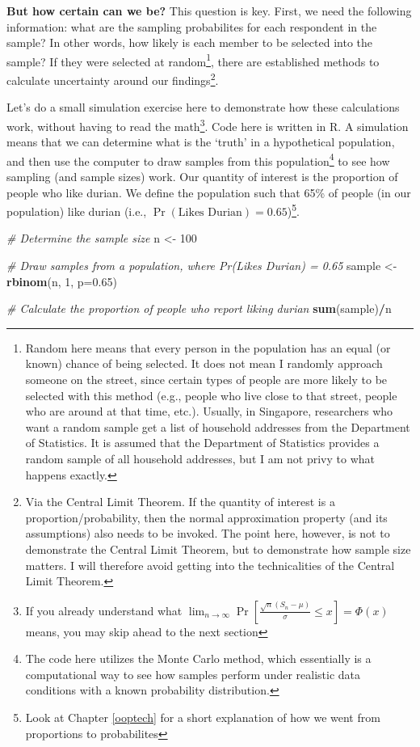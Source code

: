 \documentclass[openany]{book}
\newenvironment{Shaded}{\begin{snugshade}}{\end{snugshade}}
\newcommand{\KeywordTok}[1]{\textcolor[rgb]{0.13,0.29,0.53}{\textbf{#1}}}
\newcommand{\DataTypeTok}[1]{\textcolor[rgb]{0.13,0.29,0.53}{#1}}
\newcommand{\DecValTok}[1]{\textcolor[rgb]{0.00,0.00,0.81}{#1}}
\newcommand{\FloatTok}[1]{\textcolor[rgb]{0.00,0.00,0.81}{#1}}
\newcommand{\StringTok}[1]{\textcolor[rgb]{0.31,0.60,0.02}{#1}}
\newcommand{\CommentTok}[1]{\textcolor[rgb]{0.56,0.35,0.01}{\textit{#1}}}
\newcommand{\OperatorTok}[1]{\textcolor[rgb]{0.81,0.36,0.00}{\textbf{#1}}}
\newcommand{\NormalTok}[1]{#1}
\let\rmarkdownfootnote\footnote%
\def\footnote{\protect\rmarkdownfootnote}
\begin{document}
\textbf{But how certain can we be?} This question is key. First, we need
the following information: what are the sampling probabilites for each
respondent in the sample? In other words, how likely is each member to
be selected into the sample? If they were selected at random\footnote{Random
  here means that every person in the population has an equal (or known)
  chance of being selected. It does not mean I randomly approach someone
  on the street, since certain types of people are more likely to be
  selected with this method (e.g., people who live close to that street,
  people who are around at that time, etc.). Usually, in Singapore,
  researchers who want a random sample get a list of household addresses
  from the Department of Statistics. It is assumed that the Department
  of Statistics provides a random sample of all household addresses, but
  I am not privy to what happens exactly.}, there are established
methods to calculate uncertainty around our findings\footnote{Via the
  Central Limit Theorem. If the quantity of interest is a
  proportion/probability, then the normal approximation property (and
  its assumptions) also needs to be invoked. The point here, however, is
  not to demonstrate the Central Limit Theorem, but to demonstrate how
  sample size matters. I will therefore avoid getting into the
  technicalities of the Central Limit Theorem.}.

Let's do a small simulation exercise here to demonstrate how these
calculations work, without having to read the math\footnote{If you
  already understand what
  \(\lim_{n \to \infty} \Pr\left[\frac{\sqrt{n}(S_n - \mu)}{\sigma} \leq x \right]= \Phi(x)\)
  means, you may skip ahead to the next section}. Code here is written
in R. A simulation means that we can determine what is the `truth' in a
hypothetical population, and then use the computer to draw samples from
this population\footnote{The code here utilizes the Monte Carlo method,
  which essentially is a computational way to see how samples perform
  under realistic data conditions with a known probability distribution.}
to see how sampling (and sample sizes) work. Our quantity of interest is
the proportion of people who like durian. We define the population such
that 65\% of people (in our population) like durian (i.e.,
\(\Pr(\text{Likes Durian}) = 0.65\))\footnote{Look at Chapter
  \ref{ooptech} for a short explanation of how we went from proportions
  to probabilites}.

\begin{Shaded}
\begin{Highlighting}[]
\CommentTok{# Determine the sample size }
\NormalTok{n <-}\StringTok{ }\DecValTok{100}

\CommentTok{# Draw samples from a population, where Pr(Likes Durian) = 0.65}
\NormalTok{sample <-}\StringTok{ }\KeywordTok{rbinom}\NormalTok{(n, }\DecValTok{1}\NormalTok{, }\DataTypeTok{p=}\FloatTok{0.65}\NormalTok{)}

\CommentTok{# Calculate the proportion of people who report liking durian}
\KeywordTok{sum}\NormalTok{(sample)}\OperatorTok{/}\NormalTok{n}
\end{Highlighting}
\end{Shaded}
\end{document}
